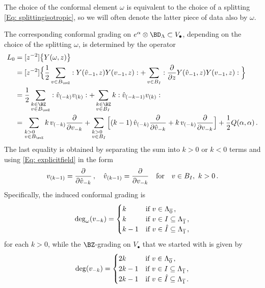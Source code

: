 \begin{remark}
\notready
    The choice of the conformal element $\omega$ is equivalent to the choice of a splitting
 \eqref{Eq: splittingisotropic}, so we will often denote the latter piece of data also by $\omega$.
\end{remark}

The corresponding conformal grading on $e^\alpha\otimes \BD_\Lambda\subset V_\bullet$, depending on the choice of the splitting $\omega$, is determined by the operator
\begin{align*}
L_0
&=[z^{-2}]\big\{Y(\omega,z)\big\}\\
&=[z^{-2}]\Big\{\frac{1}{2}\sum_{v\in B_{\ovZ}}:Y(\hat{v}_{-1},z)Y(v_{-1},z):
+\sum_{v\in B_I}:\frac{\partial}{\partial z}Y(\hat{v}_{-1},z)Y(v_{-1},z):\Big \}\\
&=\frac{1}{2}\sum_{\begin{subarray} a k\in\BZ\\
v\in B_{\ovZ}\end{subarray}}:\hat{v}_{(-k)}v_{(k)}:
+\sum_{\begin{subarray} a k\in\BZ\\
v\in B_I\end{subarray}}k:\hat{v}_{(-k-1)}v_{(k)}:
\\
&=\sum_{\begin{subarray} a k> 0\\
v\in B_{\ovZ}\end{subarray}}k\,v_{(-k)}\frac{\partial}{\partial v_{-k}}
+\sum_{\begin{subarray} a k> 0\\ v\in B_I\end{subarray}}
\Big[(k-1)\,\hat{v}_{(-k)}\frac{\partial}{\partial \hat{v}_{-k}}+k\,v_{(-k)}\frac{\partial}{\partial v_{-k}}\Big]
+\frac{1}{2}Q(\alpha,\alpha)
\,.
\end{align*}
The last equality is obtained by separating the sum into $k>0$ or $k<0$ terms and using \eqref{Eq: explicitfield} in the form
\[v_{(k-1)}=\frac{\partial}{\partial \hat v_{-k}}\,,\quad \hat v_{(k-1)}=\frac{\partial}{\partial v_{-k}} \quad \textup{for}\quad v\in B_I,\ k> 0\,.\]
Specifically, the induced conformal grading is
$$\deg_{\omega}(v_{-k})=\begin{cases}
k &\textup{if }v\in \Lambda_{\overline 0}\,,\\
k &\textup{if }v\in I\subseteq \Lambda_{\overline 1}\,,\\
k-1 &\textup{if }v\in \hat I\subseteq \Lambda_{\overline 1}\,,
\end{cases}
$$
for each $k>0$, while the $\BZ$-grading on $V_\bullet$ that we started with is given by
$$\deg(v_{-k})=\begin{cases}
2k &\textup{if }v\in \Lambda_{\overline 0}\,,\\
2k-1 &\textup{if }v\in I\subseteq \Lambda_{\overline 1}\,,\\
2k-1 &\textup{if }v\in \hat I\subseteq \Lambda_{\overline 1}\,.
\end{cases}
$$

